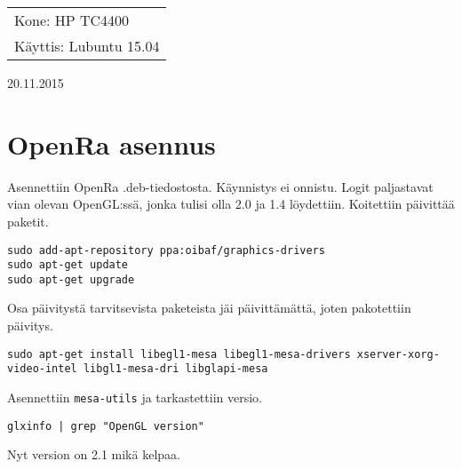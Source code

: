 \documentclass[main.tex]{subfiles}
\begin{document}
\lstset{language=sh}
\thispagestyle{empty}
\begin{tabular}[t]{l}
Kone: HP TC4400\\
Käyttis: Lubuntu 15.04
\end{tabular}
\hfill 20.11.2015

{\section{OpenRa asennus}}

Asennettiin OpenRa .deb-tiedostosta. Käynnistys ei onnistu. Logit paljastavat vian olevan OpenGL:ssä, jonka tulisi olla 2.0 ja 1.4 löydettiin. Koitettiin päivittää paketit.

\begin{lstlisting}
sudo add-apt-repository ppa:oibaf/graphics-drivers
sudo apt-get update
sudo apt-get upgrade
\end{lstlisting}

Osa päivitystä tarvitsevista paketeista jäi päivittämättä, joten pakotettiin päivitys.

\begin{lstlisting}
sudo apt-get install libegl1-mesa libegl1-mesa-drivers xserver-xorg-video-intel libgl1-mesa-dri libglapi-mesa 
\end{lstlisting}

Asennettiin \texttt{mesa-utils} ja tarkastettiin versio.

\begin{lstlisting}
glxinfo | grep "OpenGL version"
\end{lstlisting}

Nyt version on 2.1 mikä kelpaa.
\end{document}
